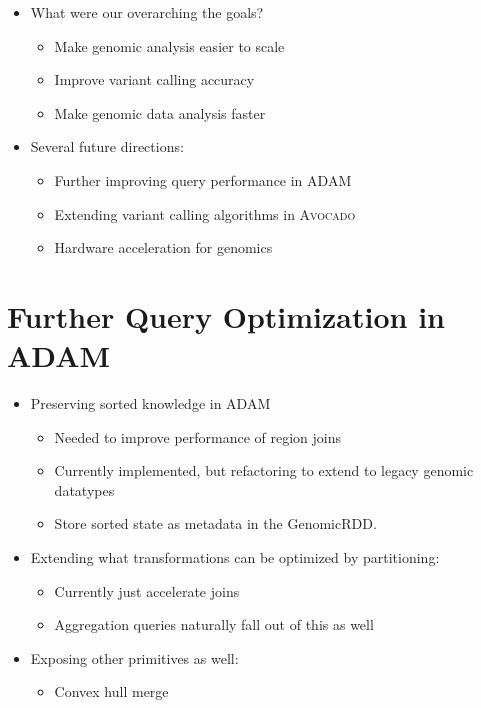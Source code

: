 \documentclass[phd]{ucbthesis}
\begin{document}
\begin{itemize}
\item What were our overarching the goals?
  \begin{itemize}
  \item Make genomic analysis easier to scale
  \item Improve variant calling accuracy
  \item Make genomic data analysis faster
  \end{itemize}
\item Several future directions:
  \begin{itemize}
  \item Further improving query performance in \textsc{ADAM}
  \item Extending variant calling algorithms in \textsc{Avocado}
  \item Hardware acceleration for genomics
  \end{itemize}
\end{itemize}

\section{Further Query Optimization in \textsc{ADAM}}
\label{sec:extensions-adam}

\begin{itemize}
\item Preserving sorted knowledge in \textsc{ADAM}
  \begin{itemize}
  \item Needed to improve performance of region joins
  \item Currently implemented, but refactoring to extend to legacy genomic datatypes
  \item Store sorted state as metadata in the GenomicRDD.
  \end{itemize}
\item Extending what transformations can be optimized by partitioning:
  \begin{itemize}
  \item Currently just accelerate joins
  \item Aggregation queries naturally fall out of this as well
  \end{itemize}
\item Exposing other primitives as well:
  \begin{itemize}
  \item Convex hull merge
  \end{itemize}
\end{itemize}
\end{document}
